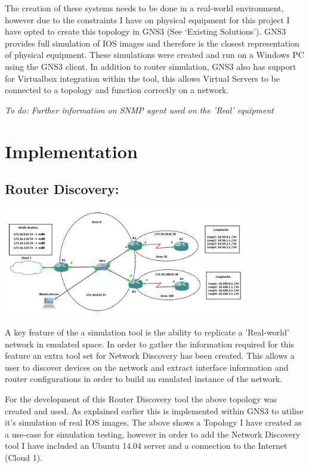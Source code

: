 \documentclass[11pt]{report}
\begin{document}
The creation of these systems needs to be done in a real-world environment, however due to the constraints I have on physical equipment for this project I have opted to create this topology in GNS3 (See ‘Existing Solutions’). GNS3 provides full simulation of IOS images and therefore is the closest representation of physical equipment. These simulations were created and run on a Windows PC using the GNS3 client. In addition to router simulation, GNS3 also has support for Virtualbox integration within the tool, this allows Virtual Servers to be connected to a topology and function correctly on a network.

\textit{To do: Further information on SNMP agent used on the 'Real' equipment}

\chapter{Implementation}

\section{Router Discovery:}

\begin{center}
\includegraphics[width=0.8\textwidth]{Lab-Design.png}
\end{center}

A key feature of the a simulation tool is the ability to replicate a 'Real-world' network in emulated space. In order to gather the information required for this feature an extra tool set for Network Discovery has been created. This allows a user to discover devices on the network and extract interface information and router configurations in order to build an emulated instance of the network.

For the development of this Router Discovery tool the above topology was created and used. As explained earlier this is implemented within GNS3 to utilise it's simulation of real IOS images. The above shows a Topology I have created as a use-case for simulation testing, however in order to add the Network Discovery tool I have included an Ubuntu 14.04 server and a connection to the Internet (Cloud 1).
\end{document}

